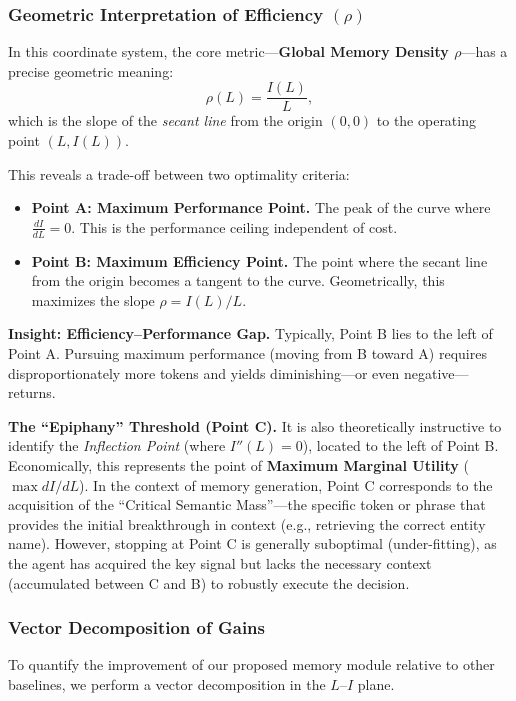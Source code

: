 \subsubsection{Geometric Interpretation of Efficiency $(\rho)$}

In this coordinate system, the core metric---\textbf{Global Memory Density $\rho$}---has a precise geometric meaning:  
\[
\rho(L) = \frac{I(L)}{L},
\]
which is the slope of the \emph{secant line} from the origin $(0,0)$ to the operating point $(L, I(L))$.

This reveals a trade-off between two optimality criteria:

\begin{itemize}
    \item \textbf{Point A: Maximum Performance Point.}  
    The peak of the curve where $\frac{dI}{dL} = 0$.  
    This is the performance ceiling independent of cost.

    \item \textbf{Point B: Maximum Efficiency Point.}  
    The point where the secant line from the origin becomes a tangent to the curve.  
    Geometrically, this maximizes the slope $\rho = I(L)/L$.
\end{itemize}

\textbf{Insight: Efficiency--Performance Gap.}  
Typically, Point B lies to the left of Point A.  
Pursuing maximum performance (moving from B toward A) requires disproportionately more tokens and yields diminishing—or even negative—returns.

\textbf{The ``Epiphany'' Threshold (Point C).}
It is also theoretically instructive to identify the \textit{Inflection Point} (where $I''(L) = 0$), located to the left of Point B. 
Economically, this represents the point of \textbf{Maximum Marginal Utility} ($\max dI/dL$). 
In the context of memory generation, Point C corresponds to the acquisition of the ``Critical Semantic Mass''—the specific token or phrase that provides the initial breakthrough in context (e.g., retrieving the correct entity name). 
However, stopping at Point C is generally suboptimal (under-fitting), as the agent has acquired the key signal but lacks the necessary context (accumulated between C and B) to robustly execute the decision.

\subsubsection{Vector Decomposition of Gains}

To quantify the improvement of our proposed memory module relative to other baselines, we perform a vector decomposition in the $L$--$I$ plane.

